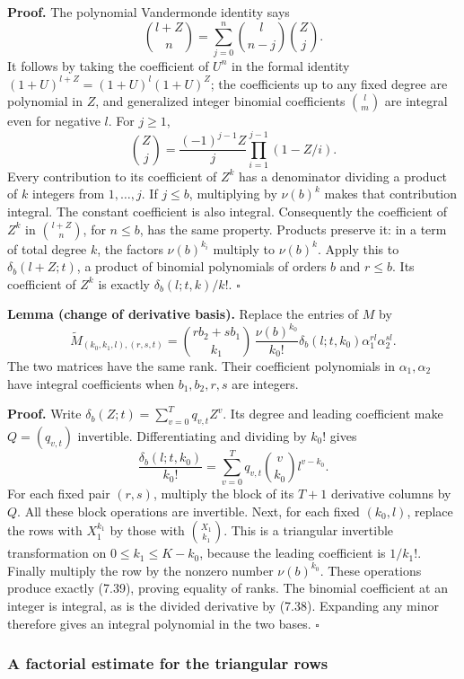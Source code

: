 \documentclass[
  11pt,
  a4paper,
]{article}
\begin{document}
\textbf{Proof.} The polynomial Vandermonde identity says \[
\binom{l+Z}{n}=\sum_{j=0}^n\binom l{n-j}\binom Zj.
\] It follows by taking the coefficient of \(U^n\) in the formal
identity \((1+U)^{l+Z}=(1+U)^l(1+U)^Z\); the coefficients up to any
fixed degree are polynomial in \(Z\), and generalized integer binomial
coefficients \(\binom lm\) are integral even for negative \(l\). For
\(j\ge1\), \[
\binom Zj=\frac{(-1)^{j-1}Z}{j}
\prod_{i=1}^{j-1}(1-Z/i).
\] Every contribution to its coefficient of \(Z^k\) has a denominator
dividing a product of \(k\) integers from \(1,\ldots,j\). If \(j\le b\),
multiplying by \(\nu(b)^k\) makes that contribution integral. The
constant coefficient is also integral. Consequently the coefficient of
\(Z^k\) in \(\binom{l+Z}{n}\), for \(n\le b\), has the same property.
Products preserve it: in a term of total degree \(k\), the factors
\(\nu(b)^{k_i}\) multiply to \(\nu(b)^k\). Apply this to
\(\delta_b(l+Z;t)\), a product of binomial polynomials of orders \(b\)
and \(r\le b\). Its coefficient of \(Z^k\) is exactly
\(\delta_b(l;t,k)/k!\). \(\square\)

\textbf{Lemma (change of derivative basis).} Replace the entries of
\(M\) by \[
\widetilde M_{(k_0,k_1,l),(r,s,t)}
=\binom{rb_2+sb_1}{k_1}\,
\frac{\nu(b)^{k_0}}{k_0!}\delta_b(l;t,k_0)
\alpha_1^{rl}\alpha_2^{sl}. \tag{7.39}
\] The two matrices have the same rank. Their coefficient polynomials in
\(\alpha_1,\alpha_2\) have integral coefficients when \(b_1,b_2,r,s\)
are integers.

\textbf{Proof.} Write \(\delta_b(Z;t)=\sum_{v=0}^Tq_{v,t}Z^v\). Its
degree and leading coefficient make \(Q=(q_{v,t})\) invertible.
Differentiating and dividing by \(k_0!\) gives \[
\frac{\delta_b(l;t,k_0)}{k_0!}
=\sum_{v=0}^Tq_{v,t}\binom v{k_0}l^{v-k_0}.
\] For each fixed pair \((r,s)\), multiply the block of its \(T+1\)
derivative columns by \(Q\). All these block operations are invertible.
Next, for each fixed \((k_0,l)\), replace the rows with \(X_1^{k_1}\) by
those with \(\binom{X_1}{k_1}\). This is a triangular invertible
transformation on \(0\le k_1\le K-k_0\), because the leading coefficient
is \(1/k_1!\). Finally multiply the row by the nonzero number
\(\nu(b)^{k_0}\). These operations produce exactly (7.39), proving
equality of ranks. The binomial coefficient at an integer is integral,
as is the divided derivative by (7.38). Expanding any minor therefore
gives an integral polynomial in the two bases. \(\square\)

\subsubsection{A factorial estimate for the triangular
rows}\label{a-factorial-estimate-for-the-triangular-rows}
\end{document}
